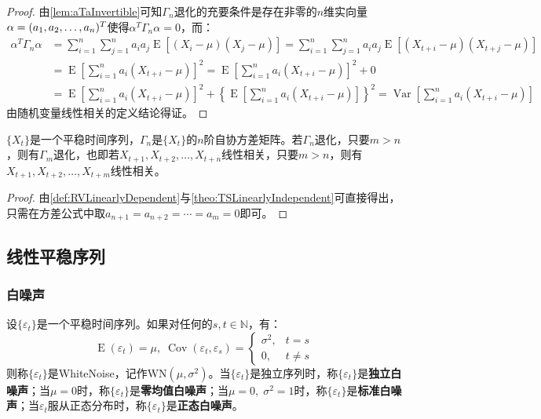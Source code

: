 \begin{proof}
	由\cref{lem:aTaInvertible}可知$\Gamma_n$退化的充要条件是存在非零的$n$维实向量$\alpha=(a_1, a_2, \dots, a_{n})^T$使得$\alpha^T\Gamma_n\alpha=0$，而：
	\begin{align*}
		\alpha^T\Gamma_n\alpha
		&=\sum_{i=1}^{n}\sum_{j=1}^{n}a_ia_j\operatorname{E}[(X_i-\mu)(X_j-\mu)] =\sum_{i=1}^{n}\sum_{j=1}^{n}a_ia_j\operatorname{E}[(X_{t+i}-\mu)(X_{t+j}-\mu)] \\
		&=\operatorname{E}\left[\sum_{i=1}^{n}a_i(X_{t+i}-\mu)\right]^2 =\operatorname{E}\left[\sum_{i=1}^{n}a_i(X_{t+i}-\mu)\right]^2+0 \\
		&=\operatorname{E}\left[\sum_{i=1}^{n}a_i(X_{t+i}-\mu)\right]^2+\left\{\operatorname{E}\left[\sum_{i=1}^{n}a_i(X_{t+i}-\mu)\right]\right\}^2 =\operatorname{Var}\left[\sum_{i=1}^{n}a_i(X_{t+i}-\mu)\right]
	\end{align*}
	由随机变量线性相关的定义结论得证。
\end{proof}
\begin{theorem}
	$\{X_t\}$是一个平稳时间序列，$\Gamma_n$是$\{X_t\}$的$n$阶自协方差矩阵。若$\Gamma_n$退化，只要$m>n$，则有$\Gamma_m$退化，也即若$X_{t+1},X_{t+2},\dots,X_{t+n}$线性相关，只要$m>n$，则有$X_{t+1},X_{t+2},\dots,X_{t+m}$线性相关。
\end{theorem}
\begin{proof}
	由\cref{def:RVLinearlyDependent}与\cref{theo:TSLinearlyIndependent}可直接得出，只需在方差公式中取$a_{n+1}=a_{n+2}=\cdots=a_{m}=0$即可。
\end{proof}

\subsection{线性平稳序列}
\subsubsection{白噪声}
\begin{definition}
	设$\{\varepsilon_t\}$是一个平稳时间序列。如果对任何的$s,t\in\mathbb{N}$，有：
	\begin{equation*}
		\operatorname{E}(\varepsilon_t)=\mu,\;
		\operatorname{Cov}(\varepsilon_t,\varepsilon_s)=
		\begin{cases}
			\sigma^2, & t=s \\
			0, & t\ne s
		\end{cases}
	\end{equation*}
	则称$\{\varepsilon_t\}$是\gls{WhiteNoise}，记作WN$(\mu,\sigma^2)$。当$\{\varepsilon_t\}$是独立序列时，称$\{\varepsilon_t\}$是\textbf{独立白噪声}；当$\mu=0$时，称$\{\varepsilon_t\}$是\textbf{零均值白噪声}；当$\mu=0,\;\sigma^2=1$时，称$\{\varepsilon_t\}$是\textbf{标准白噪声}；当$\varepsilon_t$服从正态分布时，称$\{\varepsilon_t\}$是\textbf{正态白噪声}。
\end{definition}
